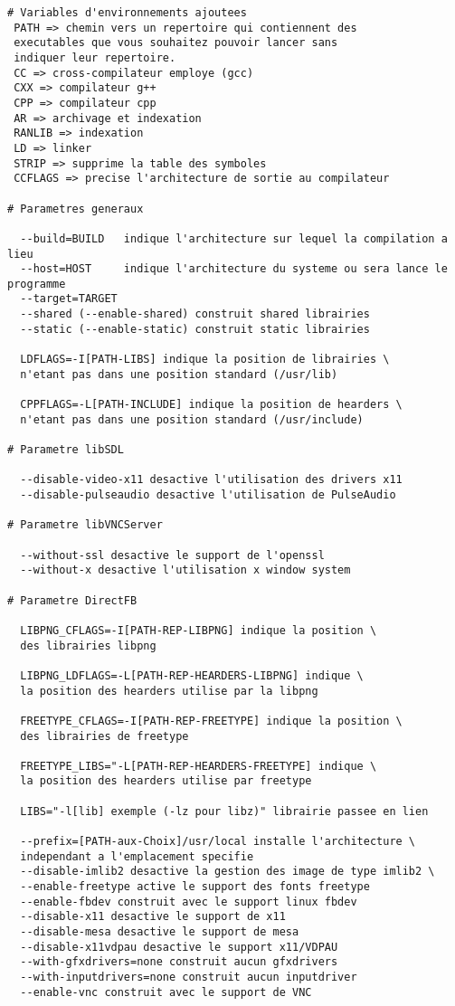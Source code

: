 \begin{lstlisting}
# Variables d'environnements ajoutees
 PATH => chemin vers un repertoire qui contiennent des
 executables que vous souhaitez pouvoir lancer sans
 indiquer leur repertoire.
 CC => cross-compilateur employe (gcc)
 CXX => compilateur g++
 CPP => compilateur cpp
 AR => archivage et indexation
 RANLIB => indexation
 LD => linker
 STRIP => supprime la table des symboles
 CCFLAGS => precise l'architecture de sortie au compilateur

# Parametres generaux
  
  --build=BUILD   indique l'architecture sur lequel la compilation a lieu
  --host=HOST     indique l'architecture du systeme ou sera lance le programme   
  --target=TARGET 
  --shared (--enable-shared) construit shared librairies
  --static (--enable-static) construit static librairies
 
  LDFLAGS=-I[PATH-LIBS] indique la position de librairies \ 
  n'etant pas dans une position standard (/usr/lib)
  
  CPPFLAGS=-L[PATH-INCLUDE] indique la position de hearders \ 
  n'etant pas dans une position standard (/usr/include)
  
# Parametre libSDL

  --disable-video-x11 desactive l'utilisation des drivers x11 
  --disable-pulseaudio desactive l'utilisation de PulseAudio
  
# Parametre libVNCServer  

  --without-ssl desactive le support de l'openssl
  --without-x desactive l'utilisation x window system
  
# Parametre DirectFB 

  LIBPNG_CFLAGS=-I[PATH-REP-LIBPNG] indique la position \ 
  des librairies libpng
  
  LIBPNG_LDFLAGS=-L[PATH-REP-HEARDERS-LIBPNG] indique \ 
  la position des hearders utilise par la libpng
  
  FREETYPE_CFLAGS=-I[PATH-REP-FREETYPE] indique la position \ 
  des librairies de freetype
 
  FREETYPE_LIBS="-L[PATH-REP-HEARDERS-FREETYPE] indique \ 
  la position des hearders utilise par freetype
 
  LIBS="-l[lib] exemple (-lz pour libz)" librairie passee en lien
  
  --prefix=[PATH-aux-Choix]/usr/local installe l'architecture \ 
  independant a l'emplacement specifie
  --disable-imlib2 desactive la gestion des image de type imlib2 \
  --enable-freetype active le support des fonts freetype 
  --enable-fbdev construit avec le support linux fbdev
  --disable-x11 desactive le support de x11
  --disable-mesa desactive le support de mesa
  --disable-x11vdpau desactive le support x11/VDPAU
  --with-gfxdrivers=none construit aucun gfxdrivers
  --with-inputdrivers=none construit aucun inputdriver
  --enable-vnc construit avec le support de VNC
  
\end{lstlisting}

